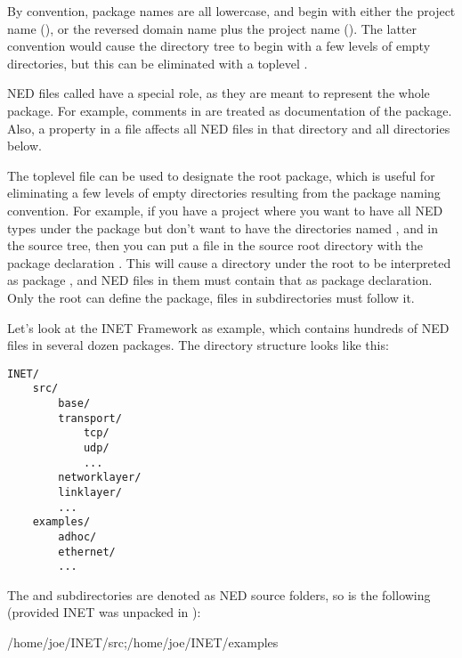 By convention, package names are all lowercase, and begin with either
the project name (), or the reversed domain name plus the
project name (). The latter convention
would cause the directory tree to begin with a few levels of empty
directories, but this can be eliminated with a toplevel .

NED files called  have a special role, as they are meant
to represent the whole package. For example, comments in
 are treated as documentation of the package. Also, a
 property in a  file affects all NED
files in that directory and all directories below.

The toplevel  file can be used to designate the root
package, which is useful for eliminating a few levels of empty directories
resulting from the package naming convention. For example, if you have a
project where you want to have all NED types under the 
package but don't want to have the directories named ,  and
 in the source tree, then you can put a 
file in the source root directory with the package declaration
. This will cause a directory  under the
root to be interpreted as package , and NED
files in them must contain that as package declaration. Only the root
 can define the package,  files
in subdirectories must follow it.

Let's look at the INET Framework as example, which contains hundreds of NED
files in several dozen packages. The directory structure looks like this:

\begin{Verbatim}
INET/
    src/
        base/
        transport/
            tcp/
            udp/
            ...
        networklayer/
        linklayer/
        ...
    examples/
        adhoc/
        ethernet/
        ...
\end{Verbatim}

The  and  subdirectories are denoted as NED source
folders, so  is the following (provided INET was unpacked in
):

\begin{filelisting}
/home/joe/INET/src;/home/joe/INET/examples
\end{filelisting}

